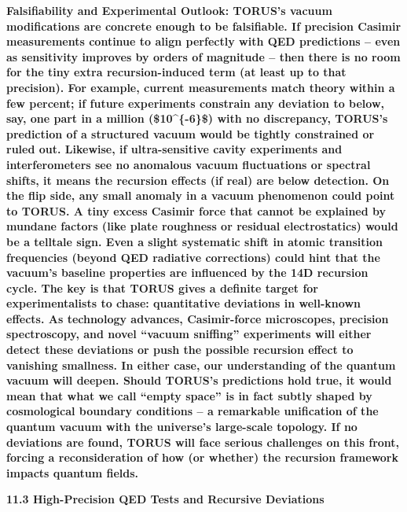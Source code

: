 \documentclass[]{article}
\begin{document}
\textbf{Falsifiability and Experimental Outlook: TORUS's vacuum
modifications are concrete enough to be falsifiable. If precision
Casimir measurements continue to align perfectly with QED predictions --
even as sensitivity improves by orders of magnitude -- then there is no
room for the tiny extra recursion-induced term (at least up to that
precision). For example, current measurements match theory within a few
percent; if future experiments constrain any deviation to below, say,
one part in a million (\$10\^{}\{-6\}\$) with no discrepancy, TORUS's
prediction of a structured vacuum would be tightly constrained or ruled
out. Likewise, if ultra-sensitive cavity experiments and interferometers
see no anomalous vacuum fluctuations or spectral shifts, it means the
recursion effects (if real) are below detection. On the flip side, any
small anomaly in a vacuum phenomenon could point to TORUS. A tiny excess
Casimir force that cannot be explained by mundane factors (like plate
roughness or residual electrostatics) would be a telltale sign. Even a
slight systematic shift in atomic transition frequencies (beyond QED
radiative corrections) could hint that the vacuum's baseline properties
are influenced by the 14D recursion cycle. The key is that TORUS gives a
definite target for experimentalists to chase: quantitative deviations
in well-known effects. As technology advances, Casimir-force
microscopes, precision spectroscopy, and novel ``vacuum sniffing''
experiments will either detect these deviations or push the possible
recursion effect to vanishing smallness. In either case, our
understanding of the quantum vacuum will deepen. Should TORUS's
predictions hold true, it would mean that what we call ``empty space''
is in fact subtly shaped by cosmological boundary conditions -- a
remarkable unification of the quantum vacuum with the universe's
large-scale topology. If no deviations are found, TORUS will face
serious challenges on this front, forcing a reconsideration of how (or
whether) the recursion framework impacts quantum fields.}

\textbf{11.3 High-Precision QED Tests and Recursive Deviations}
\end{document}
